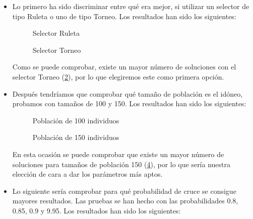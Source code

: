 \documentclass[a4,11pt]{article}
\begin{document}
\begin{itemize}

\item Lo primero ha sido discriminar entre qué era mejor, si utilizar un selector de tipo Ruleta o uno de tipo Torneo. Los resultados han sido los siguientes:


\begin{figure}[h]
\begin{center}
\end{center}
\caption{Selector Ruleta}
\label{fig:ruleta}
\end{figure}


\begin{figure}[h]
\begin{center}
\end{center}
\caption{Selector Torneo}
\label{fig:torneo}
\end{figure}

Como se puede comprobar, existe un mayor número de soluciones con el selector Torneo (\ref{fig:torneo}), por lo que elegiremos este como primera opción.

\item Después tendríamos que comprobar qué tamaño de población es el idóneo, probamos con tamaños de 100 y 150. Los resultados han sido los siguientes:

\begin{figure}[h]
\begin{center}
\end{center}
\caption{Población de 100 individuos}
\label{fig:pob100}
\end{figure}

\begin{figure}[h]
\begin{center}
\end{center}
\caption{Población de 150 individuos}
\label{fig:pob150}
\end{figure}

En esta ocasión se puede comprobar que existe un mayor número de soluciones para tamaños de población 150 (\ref{fig:pob150}), por lo que sería nuestra elección de cara a dar los parámetros más aptos.

\item Lo siguiente sería comprobar para qué probabilidad de cruce se consigue mayores resultados. Las pruebas se han hecho con las probabilidades 0.8, 0.85, 0.9 y 9.95. Los resultados han sido los siguientes:



\end{itemize}
\end{document}
